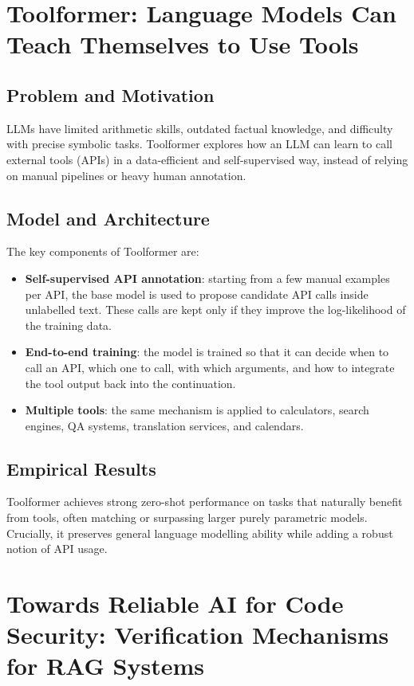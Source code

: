 \documentclass[11pt,a4paper]{article}
\begin{document}
\section{Toolformer: Language Models Can Teach Themselves to Use Tools}

\subsection{Problem and Motivation}

LLMs have limited arithmetic skills, outdated factual knowledge, and difficulty with precise symbolic tasks. Toolformer explores how an LLM can learn to call external tools (APIs) in a data-efficient and self-supervised way, instead of relying on manual pipelines or heavy human annotation.

\subsection{Model and Architecture}

The key components of Toolformer are:
\begin{itemize}[leftmargin=1.2cm]
  \item \textbf{Self-supervised API annotation}: starting from a few manual examples per API, the base model is used to propose candidate API calls inside unlabelled text. These calls are kept only if they improve the log-likelihood of the training data.
  \item \textbf{End-to-end training}: the model is trained so that it can decide when to call an API, which one to call, with which arguments, and how to integrate the tool output back into the continuation.
  \item \textbf{Multiple tools}: the same mechanism is applied to calculators, search engines, QA systems, translation services, and calendars.
\end{itemize}

\subsection{Empirical Results}

Toolformer achieves strong zero-shot performance on tasks that naturally benefit from tools, often matching or surpassing larger purely parametric models. Crucially, it preserves general language modelling ability while adding a robust notion of API usage.

\section{Towards Reliable AI for Code Security: Verification Mechanisms for RAG Systems}
\end{document}
